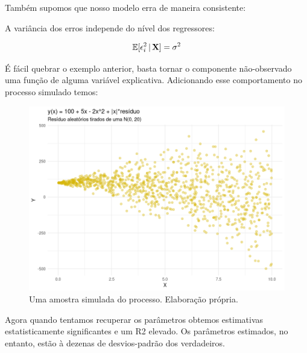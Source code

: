 Também supomos que nosso modelo erra de maneira consistente:

\begin{hipotese}[Homocedasticidade]
A variância dos erros independe do nível dos regressores:

\begin{align}
    \mathbb{E}[\epsilon_i^2\, |\, \mathbf{X} ] = \sigma^2
\end{align}


\end{hipotese}

\begin{exemplo}[Heterocedasticidade]
É fácil quebrar o exemplo anterior, basta tornar o componente não-observado uma função de alguma variável explicativa. Adicionando esse comportamento no processo simulado temos:

\begin{figure}[H]
    \centering
    \includegraphics[scale = .75]{imagens/exemplo_heteroske.png}
    \caption{Uma amostra simulada do processo. Elaboração própria.}
\end{figure}



Agora quando tentamos recuperar os parâmetros obtemos estimativas estatisticamente significantes e um R2 elevado. Os parâmetros estimados, no entanto, estão à dezenas de desvios-padrão dos verdadeiros.


\end{exemplo}





